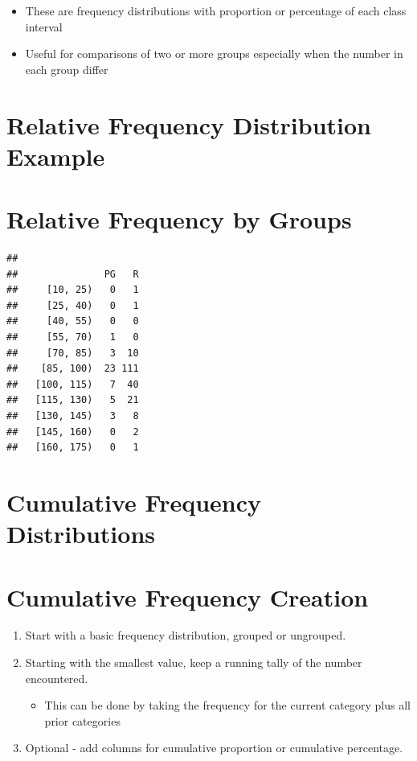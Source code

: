 \documentclass[12pt]{article}
\begin{document}
\begin{itemize}
\itemsep1pt\parskip0pt
\item
  These are frequency distributions with proportion or percentage of
  each class interval
\item
  Useful for comparisons of two or more groups especially when the
  number in each group differ
\end{itemize}

\section{Relative Frequency Distribution
Example}\label{relative-frequency-distribution-example}
\vspace{2in} 

\section{Relative Frequency by
Groups}\label{relative-frequency-by-groups}

\begin{verbatim}
##     
##               PG   R
##     [10, 25)   0   1
##     [25, 40)   0   1
##     [40, 55)   0   0
##     [55, 70)   1   0
##     [70, 85)   3  10
##    [85, 100)  23 111
##   [100, 115)   7  40
##   [115, 130)   5  21
##   [130, 145)   3   8
##   [145, 160)   0   2
##   [160, 175)   0   1
\end{verbatim}

\section{Cumulative Frequency
Distributions}\label{cumulative-frequency-distributions}
\vspace{2in} 

\section{Cumulative Frequency
Creation}\label{cumulative-frequency-creation}

\begin{enumerate}
\def\labelenumi{\arabic{enumi}.}
\itemsep1pt\parskip0pt
\item
  Start with a basic frequency distribution, grouped or ungrouped.
\item
  Starting with the smallest value, keep a running tally of the number
  encountered.

  \begin{itemize}
  \itemsep1pt\parskip0pt
  \item
    This can be done by taking the frequency for the current category
    plus all prior categories
  \end{itemize}
\item
  Optional - add columns for cumulative proportion or cumulative
  percentage.
\end{enumerate}
\end{document}
